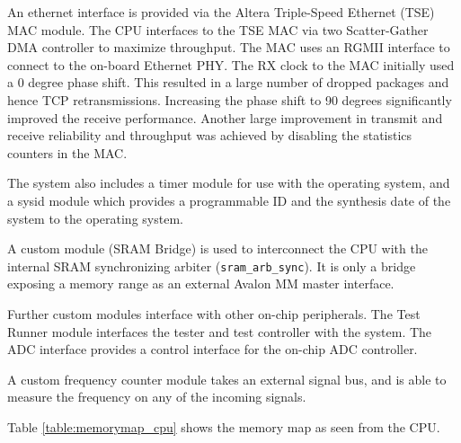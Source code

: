 An ethernet interface is provided via the Altera Triple-Speed Ethernet (TSE) MAC module. The
CPU interfaces to the TSE MAC via two Scatter-Gather DMA controller to maximize throughput. The
MAC uses an RGMII interface to connect to the on-board Ethernet PHY. The RX clock to the MAC
initially used a 0 degree phase shift. This resulted in a large number of dropped packages and
hence TCP retransmissions. Increasing the phase shift to 90 degrees significantly improved
the receive performance. Another large improvement in transmit and receive reliability and
throughput was achieved by disabling the statistics counters in the MAC.

The system also includes a timer module for use with the operating system, and a sysid module
which provides a programmable ID and the synthesis date of the system to the operating system.

A custom module (SRAM Bridge) is used to interconnect the CPU with the internal SRAM synchronizing
arbiter (\texttt{sram\_arb\_sync}). It is only a bridge exposing a memory range as an external
Avalon MM master interface.

Further custom modules interface with other on-chip peripherals. The Test Runner module
interfaces the tester and test controller with the system. The ADC interface provides a control
interface for the on-chip ADC controller.

A custom frequency counter module takes an external signal bus, and is able to measure the frequency
on any of the incoming signals.

Table \ref{table:memorymap_cpu} shows the memory map as seen from the CPU.

